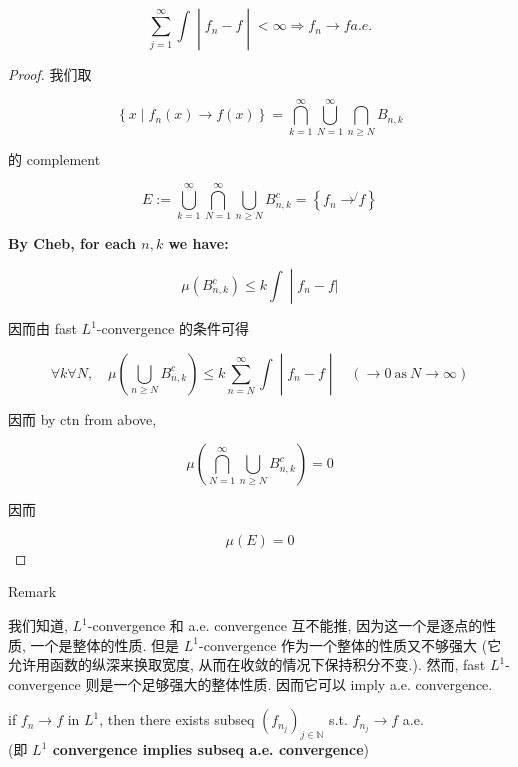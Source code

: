 \begin{proposition}{}

\[\left. \sum\limits_{j = 1}^{\infty}\int \middle| f_{n} - f \middle| < \infty\Longrightarrow f_{n}\rightarrow f a.e. \right.\]

\end{proposition}

\begin{proof}

我们取

\[\left\{ {x \mid f_{n}(x)\rightarrow f(x)} \right\} = \bigcap\limits_{k = 1}^{\infty}\bigcup\limits_{N = 1}^{\infty}\bigcap\limits_{n \geq N}B_{n,k}\]

的 complement

\[E := \bigcup\limits_{k = 1}^{\infty}\bigcap\limits_{N = 1}^{\infty}\bigcup\limits_{n \geq N}B_{n,k}^{c} = \left\{ {f_{n}\operatorname{\rightarrow\not{}}f} \right\}\]

\textbf{By Cheb, for each \(n,k\) we have:}

\[\left. \mu(B_{n,k}^{c}) \leq k\int \middle| f_{n} - f| \right.\]

因而由 fast \(L^{1}\)-convergence 的条件可得

\[\left. \forall k\forall N,\quad\mu(\bigcup\limits_{n \geq N}B_{n,k}^{c}) \leq k\sum\limits_{n = N}^{\infty}\int \middle| f_{n} - f \middle| \quad(\rightarrow 0\ \text{as}\ N\rightarrow\infty) \right.\]

因而 by ctn from above,

\[\mu(\bigcap\limits_{N = 1}^{\infty}\bigcup\limits_{n \geq N}B_{n,k}^{c}) = 0\]

因而

\[\mu(E) = 0\]

\end{proof}

\begin{qlremark}{Remark}

我们知道, \(L^{1}\)-convergence 和 a.e. convergence 互不能推, 因为这一个是逐点的性质, 一个是整体的性质. 但是 \(L^{1}\)-convergence 作为一个整体的性质又不够强大 (它允许用函数的纵深来换取宽度, 从而在收敛的情况下保持积分不变.). 然而, fast \(L^{1}\)-convergence 则是一个足够强大的整体性质. 因而它可以 imply a.e. convergence.

\end{qlremark}

\begin{corollary}{}

if \(f_{n}\rightarrow f\) in \(L^{1}\), then there exists subseq \((f_{n_{j}})_{j \in \mathbb{N}}\) s.t. \(f_{n_{j}}\rightarrow f\) a.e.\\
(即 \textbf{\(L^{1}\) convergence implies subseq a.e. convergence})

\end{corollary}

